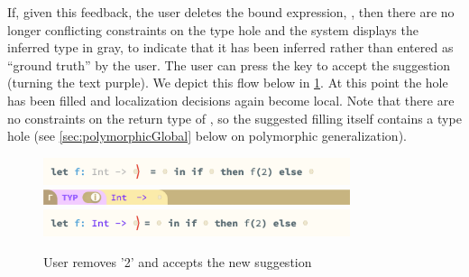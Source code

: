 If, given this feedback, the user deletes the bound expression, , then there are no longer conflicting constraints on the type hole and the system displays the inferred type in gray, to indicate that it has been inferred rather than entered as ``ground truth'' by the user. The user can press the  key to accept the suggestion (turning the text purple). We depict this flow below in \cref{fig:editor_ghost}. At this point the hole has been filled and localization decisions again become local. Note that there are no constraints on the return type of , so the suggested filling itself contains a type hole (see \cref{sec:polymorphicGlobal} below on polymorphic generalization).
\begin{figure}[H]
\includegraphics[width=9cm]{images/example_holes_filled.png}
\includegraphics[width=9cm]{images/example_holes_CI.png}
\includegraphics[width=9cm]{images/example_holes.png}
\caption{User removes '2' and accepts the new suggestion}
\label{fig:editor_ghost}
\end{figure}




